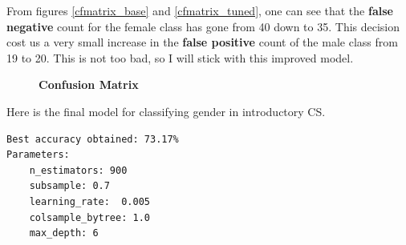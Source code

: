 From figures \ref{cfmatrix_base} and \ref{cfmatrix_tuned}, one can see that the \textbf{false negative} count for the female class has gone from 40 down to 35. This decision cost us a very small increase in the \textbf{false positive} count of the male class from 19 to 20. This is not too bad, so I will stick with this improved model.

\begin{figure}[!hbtp]
\centering

    \caption{\textbf{Confusion Matrix}}
\end{figure}

Here is the final model for classifying gender in introductory CS. 
\begin{verbatim}
Best accuracy obtained: 73.17%
Parameters:
    n_estimators: 900
    subsample: 0.7
    learning_rate:  0.005
    colsample_bytree: 1.0
    max_depth: 6

\end{verbatim}


